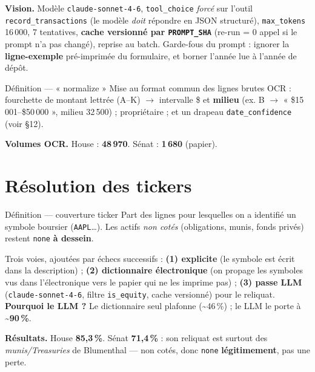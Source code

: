 \documentclass[11pt,a4paper]{article}
\newcommand{\code}[1]{\texttt{\small #1}}
\begin{document}
\textbf{Vision.} Modèle \code{claude-sonnet-4-6}, \code{tool\_choice} \emph{forcé} sur l'outil
\code{record\_transactions} (le modèle \emph{doit} répondre en JSON structuré), \code{max\_tokens}
16\,000, 7 tentatives, \textbf{cache versionné par \code{PROMPT\_SHA}} (re-run = 0 appel si le prompt n'a
pas changé), reprise au batch. Garde-fous du prompt : ignorer la \textbf{ligne-exemple} pré-imprimée du
formulaire, et borner l'année lue à l'année de dépôt.

\begin{defbox}{Définition --- « normalize »}
Mise au format commun des lignes brutes OCR : fourchette de montant lettrée (A--K) $\rightarrow$
intervalle \$ et \textbf{milieu} (ex. B $\rightarrow$ « \$15\,001--\$50\,000 », milieu 32\,500) ;
propriétaire ; et un drapeau \code{date\_confidence} (voir §12).
\end{defbox}

\textbf{Volumes OCR.} House : \textbf{48\,970}. Sénat : \textbf{1\,680} (papier).

\section{Résolution des tickers}

\begin{defbox}{Définition --- couverture ticker}
Part des lignes pour lesquelles on a identifié un symbole boursier (\code{AAPL}\dots). Les actifs
\emph{non cotés} (obligations, munis, fonds privés) restent \code{none} \textbf{à dessein}.
\end{defbox}

Trois voies, ajoutées par échecs successifs : \textbf{(1) explicite} (le symbole est écrit dans la
description) ; \textbf{(2) dictionnaire électronique} (on propage les symboles vus dans l'électronique
vers le papier qui ne les imprime pas) ; \textbf{(3) passe LLM} (\code{claude-sonnet-4-6}, filtre
\code{is\_equity}, cache versionné) pour le reliquat. \textbf{Pourquoi le LLM ?} Le dictionnaire seul
plafonne (\textasciitilde 46\,\%) ; le LLM le porte à \textbf{\textasciitilde 90\,\%}.

\textbf{Résultats.} House \textbf{85,3\,\%}. Sénat \textbf{71,4\,\%} : son reliquat est surtout des
\emph{munis/Treasuries} de Blumenthal --- non cotés, donc \code{none} \textbf{légitimement}, pas une
perte.

\end{document}

